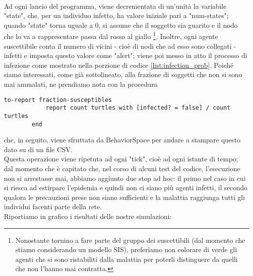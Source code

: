 \\Ad ogni lancio del programma, viene decrementata di un'unità la variabile "state", che, per un individuo infetto, ha valore iniziale pari a "num-states"; quando "state" torna uguale a $ 0 $, si assume che il soggetto sia guarito e il nodo che lo va a rappresentare passa dal rosso al giallo \footnote{Nonostante tornino a fare parte del gruppo dei suscettibili (dal momento che stiamo considerando un modello SIS), preferiamo non colorare di verde gli agenti che si sono ristabiliti dalla malattia per poterli distinguere da quelli che non l'hanno mai contratta.}. Inoltre, ogni agente suscettibile conta il numero di vicini - cioè di nodi che ad esso sono collegati - infetti e imposta questo valore come "alert"; viene poi messo in atto il processo di infezione come mostrato nella porzione di codice \ref{list:infection_prob}. Poiché siamo interessati, come già sottolineato, alla frazione di soggetti che non si sono mai ammalati, ne prendiamo nota con la procedura 
\begin{center}
	\begin{lstlisting}[language={NetLogo},caption={Metodo che riporta la frazione di suscettibili che non hanno mai contratto l'infezione.},label={list:count_susceptibles}]
		to-report fraction-susceptibles
  			report count turtles with [infected? = false] / count turtles
		end	
	\end{lstlisting}
\end{center}
che, in seguito, viene sfruttata da BehaviorSpace per andare a stampare questo dato su di un file CSV. \\ Questa operazione viene ripetuta ad ogni "tick", cioè ad ogni istante di tempo; dal momento che è capitato che, nel corso di alcuni test del codice, l'esecuzione non si arrestasse mai, abbiamo aggiunto due stop ad hoc: il primo nel caso in cui si riesca ad estirpare l'epidemia e quindi non ci siano più agenti infetti, il secondo qualora le precauzioni prese non siano sufficienti e la malattia raggiunga tutti gli individui facenti parte della rete.\\Riportiamo in grafico i risultati delle nostre simulazioni:
